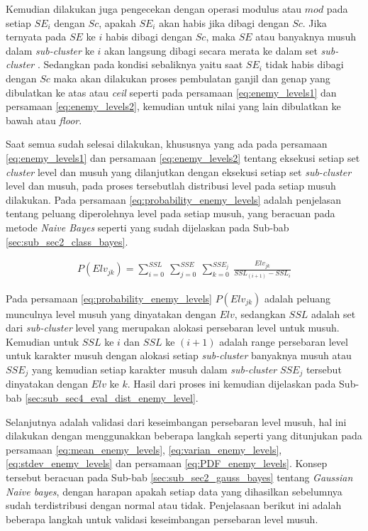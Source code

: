Kemudian dilakukan juga pengecekan dengan operasi modulus atau $mod$ pada setiap $SE_{i}$ dengan $Sc$, apakah $SE_{i}$ akan habis jika dibagi dengan $Sc$. Jika ternyata pada $SE$ ke $i$ habis dibagi dengan $Sc$, maka $SE$ atau banyaknya musuh dalam \textit{sub-cluster} ke $i$ akan langsung dibagi secara merata ke dalam set \textit{sub-cluster} . Sedangkan pada kondisi sebaliknya yaitu saat $SE_{i}$ tidak habis dibagi dengan $Sc$ maka akan dilakukan proses pembulatan ganjil dan genap yang dibulatkan ke atas atau \textit{ceil} seperti pada persamaan \ref{eq:enemy_levels1} dan persamaan \ref{eq:enemy_levels2}, kemudian untuk nilai yang lain dibulatkan ke bawah atau \textit{floor}.
\vspace{1ex}

Saat semua sudah selesai dilakukan, khususnya yang ada pada persamaan \ref{eq:enemy_levels1} dan persamaan \ref{eq:enemy_levels2} tentang eksekusi setiap set \textit{cluster} level dan musuh yang dilanjutkan dengan eksekusi setiap set \textit{sub-cluster} level dan musuh, pada proses tersebutlah distribusi level pada setiap musuh dilakukan. Pada persamaan \ref{eq:probability_enemy_levels} adalah penjelasan tentang peluang diperolehnya level pada setiap musuh, yang beracuan pada metode \textit{Naive Bayes} seperti yang sudah dijelaskan pada Sub-bab \ref{sec:sub_sec2_class_bayes}.
\vspace{1ex}

\begin{equation}\label{eq:probability_enemy_levels}
\begin{split}
P(Elv_{jk}) = \sum_{i = 0}^{SSL}\ \sum_{j = 0}^{SSE}\ \sum_{k = 0}^{SSE_{j}}\ \frac{Elv_{jk}}{SSL_{(i + 1)} - SSL_{i}}
\end{split}
\end{equation}

Pada persamaan \ref{eq:probability_enemy_levels} $P(Elv_{jk})$ adalah peluang munculnya level musuh yang dinyatakan dengan $Elv$, sedangkan $SSL$ adalah set dari \textit{sub-cluster} level yang merupakan alokasi persebaran level untuk musuh. Kemudian untuk $SSL$ ke $i$ dan $SSL$ ke $(i + 1)$ adalah range persebaran level untuk karakter musuh dengan alokasi setiap \textit{sub-cluster} banyaknya musuh atau $SSE_{j}$ yang kemudian setiap karakter musuh dalam \textit{sub-cluster} $SSE_{j}$ tersebut dinyatakan dengan $Elv$ ke $k$. Hasil dari proses ini kemudian dijelaskan pada Sub-bab \ref{sec:sub_sec4_eval_dist_enemy_level}.
\vspace{1ex}

Selanjutnya adalah validasi dari keseimbangan persebaran level musuh, hal ini dilakukan dengan menggunakkan beberapa langkah seperti yang ditunjukan pada persamaan \ref{eq:mean_enemy_levels}, \ref{eq:varian_enemy_levels}, \ref{eq:stdev_enemy_levels} dan persamaan \ref{eq:PDF_enemy_levels}. Konsep tersebut beracuan pada Sub-bab \ref{sec:sub_sec2_gauss_bayes} tentang \textit{Gaussian Naive bayes}, dengan harapan apakah setiap data yang dihasilkan sebelumnya sudah terdistribusi dengan normal atau tidak. Penjelasaan berikut ini adalah beberapa langkah untuk validasi keseimbangan persebaran level musuh.
\vspace{1ex}

